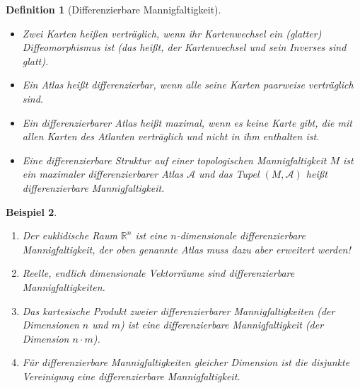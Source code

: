 \documentclass[a4paper]{scrreprt}
\numberwithin{equation}{chapter}
\newcommand{\R}{\mathds{R}}
\theoremstyle{plain}
\newtheorem{defn}{Definition}[section]
\newtheorem{bsp}[defn]{Beispiel}
\begin{document}
		\begin{defn}[Differenzierbare Mannigfaltigkeit]\hfill
			\begin{itemize}
				\item Zwei Karten heißen verträglich, wenn ihr Kartenwechsel ein (glatter) Diffeomorphismus ist (das heißt, der Kartenwechsel und sein Inverses sind glatt).
				\item Ein Atlas heißt differenzierbar, wenn alle seine Karten paarweise verträglich sind.
				\item Ein differenzierbarer Atlas heißt maximal, wenn es keine Karte gibt, die mit allen Karten des Atlanten verträglich und nicht in ihm enthalten ist.
				\item Eine differenzierbare Struktur auf einer topologischen Mannigfaltigkeit $M$ ist ein maximaler differenzierbarer Atlas $\mathcal{A}$ und das Tupel $(M,\mathcal{A})$ heißt differenzierbare Mannigfaltigkeit.
			\end{itemize}
		\end{defn}
		\begin{bsp}\hfill 
			\begin{enumerate}
				\item Der euklidische Raum $\R^n$ ist eine $n$-dimensionale differenzierbare Mannigfaltigkeit, der oben genannte Atlas muss dazu aber erweitert werden!
				\item Reelle, endlich dimensionale Vektorräume sind differenzierbare Mannigfaltigkeiten.
				\item Das kartesische Produkt zweier differenzierbarer Mannigfaltigkeiten (der Dimensionen $n$ und $m$) ist eine differenzierbare Mannigfaltigkeit (der Dimension $n\cdot m$).
				\item Für differenzierbare Mannigfaltigkeiten gleicher Dimension ist die disjunkte Vereinigung eine differenzierbare Mannigfaltigkeit.
			\end{enumerate}
		\end{bsp}
\end{document}
